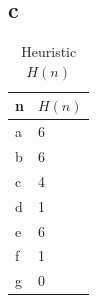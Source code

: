 \documentclass[a4paper]{article}
\begin{document}
\subsection*{c} %

\begin{table}[h]
	\centering
	\caption{Heuristic $H(n)$}
	
	\begin{tabular}{| l | l |}
		\hline
		n & $H(n)$ \\ \hline
		a & 6 \\
		b & 6 \\
		c & 4 \\
		d & 1 \\
		e & 6 \\
		f & 1 \\
		g & 0 \\
		\hline
	\end{tabular}



\end{table}
\end{document}

